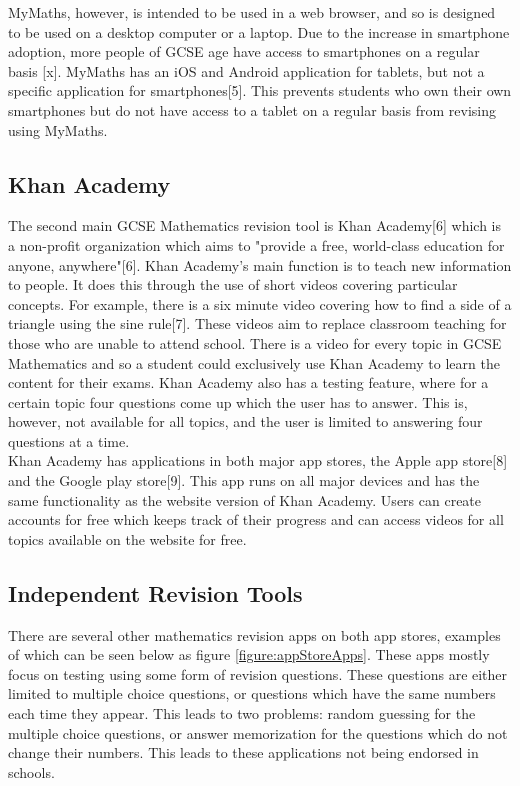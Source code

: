\documentclass{article}
\begin{document}
MyMaths, however, is intended to be used in a web browser, and so is designed to be used on a desktop computer or a laptop. Due to the increase in smartphone adoption, more people of GCSE age have access to smartphones on a regular basis [x]. 
MyMaths has an iOS and Android application for tablets, but not a specific application for smartphones[5]. This prevents students who own their own smartphones but do not have access to a tablet on a regular basis from revising using MyMaths. \\

\subsection{Khan Academy}

The second main GCSE Mathematics revision tool is Khan Academy[6] which is a non-profit organization which aims to "provide a free, world-class education for anyone, anywhere"[6]. Khan Academy's main function is to teach new information to people. It does this through the use of short videos covering particular concepts. For example, there is a six minute video covering how to find a side of a triangle using the sine rule[7]. These videos aim to replace classroom teaching for those who are unable to attend school. There is a video for every topic in GCSE Mathematics and so a student could exclusively use Khan Academy to learn the content for their exams. Khan Academy also has a testing feature, where for a certain topic four questions come up which the user has to answer. This is, however, not available for all topics, and the user is limited to answering four questions at a time. \\

Khan Academy has applications in both major app stores, the Apple app store[8] and the Google play store[9]. This app runs on all major devices and has the same functionality as the website version of Khan Academy. Users can create accounts for free which keeps track of their progress and can access videos for all topics available on the website for free. \\

\subsection{Independent Revision Tools}

There are several other mathematics revision apps on both app stores, examples of which can be seen below as figure \ref{figure:appStoreApps}. These apps mostly focus on testing using some form of revision questions. These questions are either limited to multiple choice questions, or questions which have the same numbers each time they appear. This leads to two problems: random guessing for the multiple choice questions, or answer memorization for the questions which do not change their numbers. This leads to these applications not being endorsed in schools. \\
\end{document}
